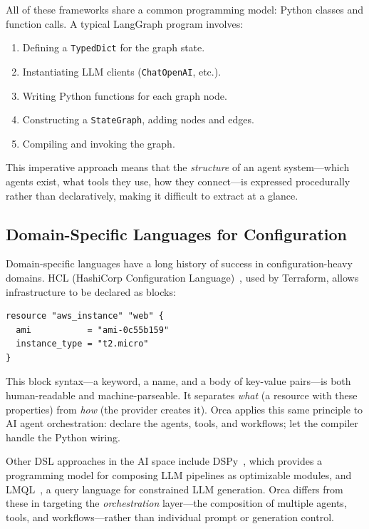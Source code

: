 \documentclass[sigconf,nonacm]{acmart}
\begin{document}
All of these frameworks share a common programming model: Python classes
and function calls. A typical LangGraph program involves:
\begin{enumerate}[leftmargin=*]
  \item Defining a \texttt{TypedDict} for the graph state.
  \item Instantiating LLM clients (\texttt{ChatOpenAI}, etc.).
  \item Writing Python functions for each graph node.
  \item Constructing a \texttt{StateGraph}, adding nodes and edges.
  \item Compiling and invoking the graph.
\end{enumerate}

This imperative approach means that the \emph{structure} of an agent
system---which agents exist, what tools they use, how they
connect---is expressed procedurally rather than declaratively, making it
difficult to extract at a glance.

\subsection{Domain-Specific Languages for Configuration}
\label{sec:background:dsls}

Domain-specific languages have a long history of success in configuration-heavy
domains. HCL (HashiCorp Configuration Language)~\cite{terraform}, used by
Terraform, allows infrastructure to be declared as blocks:

\begin{lstlisting}[language={},keywordstyle=\color{keyword}\bfseries,
  morekeywords={resource,ami,instance_type}]
resource "aws_instance" "web" {
  ami           = "ami-0c55b159"
  instance_type = "t2.micro"
}
\end{lstlisting}

This block syntax---a keyword, a name, and a body of key-value
pairs---is both human-readable and machine-parseable. It separates
\emph{what} (a resource with these properties) from \emph{how} (the
provider creates it). Orca applies this same principle to AI agent
orchestration: declare the agents, tools, and workflows; let the compiler
handle the Python wiring.

Other DSL approaches in the AI space include DSPy~\cite{dspy}, which
provides a programming model for composing LLM pipelines as optimizable
modules, and LMQL~\cite{lmql}, a query language for constrained LLM
generation. Orca differs from these in targeting the \emph{orchestration}
layer---the composition of multiple agents, tools, and workflows---rather
than individual prompt or generation control.
\end{document}
